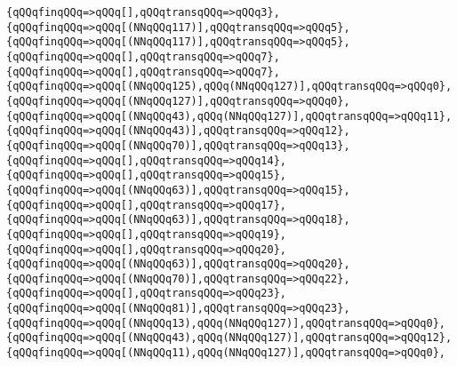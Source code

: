 \verb|{qQQqfinqQQq=>qQQq[],qQQqtransqQQq=>qQQq3},|\newline
\verb|{qQQqfinqQQq=>qQQq[(NNqQQq117)],qQQqtransqQQq=>qQQq5},|\newline
\verb|{qQQqfinqQQq=>qQQq[(NNqQQq117)],qQQqtransqQQq=>qQQq5},|\newline
\verb|{qQQqfinqQQq=>qQQq[],qQQqtransqQQq=>qQQq7},|\newline
\verb|{qQQqfinqQQq=>qQQq[],qQQqtransqQQq=>qQQq7},|\newline
\verb|{qQQqfinqQQq=>qQQq[(NNqQQq125),qQQq(NNqQQq127)],qQQqtransqQQq=>qQQq0},|\newline
\verb|{qQQqfinqQQq=>qQQq[(NNqQQq127)],qQQqtransqQQq=>qQQq0},|\newline
\verb|{qQQqfinqQQq=>qQQq[(NNqQQq43),qQQq(NNqQQq127)],qQQqtransqQQq=>qQQq11},|\newline
\verb|{qQQqfinqQQq=>qQQq[(NNqQQq43)],qQQqtransqQQq=>qQQq12},|\newline
\verb|{qQQqfinqQQq=>qQQq[(NNqQQq70)],qQQqtransqQQq=>qQQq13},|\newline
\verb|{qQQqfinqQQq=>qQQq[],qQQqtransqQQq=>qQQq14},|\newline
\verb|{qQQqfinqQQq=>qQQq[],qQQqtransqQQq=>qQQq15},|\newline
\verb|{qQQqfinqQQq=>qQQq[(NNqQQq63)],qQQqtransqQQq=>qQQq15},|\newline
\verb|{qQQqfinqQQq=>qQQq[],qQQqtransqQQq=>qQQq17},|\newline
\verb|{qQQqfinqQQq=>qQQq[(NNqQQq63)],qQQqtransqQQq=>qQQq18},|\newline
\verb|{qQQqfinqQQq=>qQQq[],qQQqtransqQQq=>qQQq19},|\newline
\verb|{qQQqfinqQQq=>qQQq[],qQQqtransqQQq=>qQQq20},|\newline
\verb|{qQQqfinqQQq=>qQQq[(NNqQQq63)],qQQqtransqQQq=>qQQq20},|\newline
\verb|{qQQqfinqQQq=>qQQq[(NNqQQq70)],qQQqtransqQQq=>qQQq22},|\newline
\verb|{qQQqfinqQQq=>qQQq[],qQQqtransqQQq=>qQQq23},|\newline
\verb|{qQQqfinqQQq=>qQQq[(NNqQQq81)],qQQqtransqQQq=>qQQq23},|\newline
\verb|{qQQqfinqQQq=>qQQq[(NNqQQq13),qQQq(NNqQQq127)],qQQqtransqQQq=>qQQq0},|\newline
\verb|{qQQqfinqQQq=>qQQq[(NNqQQq43),qQQq(NNqQQq127)],qQQqtransqQQq=>qQQq12},|\newline
\verb|{qQQqfinqQQq=>qQQq[(NNqQQq11),qQQq(NNqQQq127)],qQQqtransqQQq=>qQQq0},|\newline
